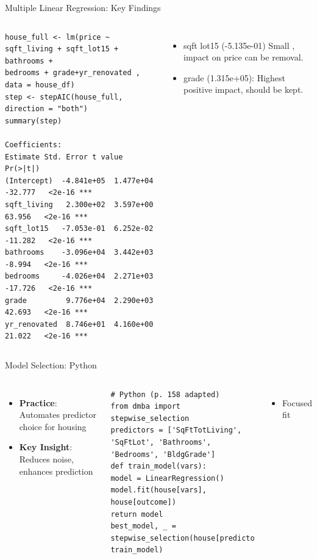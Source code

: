 \documentclass{beamer}
\begin{document}
	\begin{frame}[fragile]{Multiple Linear Regression: Key Findings}
	\begin{columns}
		\begin{lstlisting}
house_full <- lm(price ~ sqft_living + sqft_lot15 + bathrooms +
bedrooms + grade+yr_renovated , data = house_df)
step <- stepAIC(house_full, direction = "both")
summary(step)

Coefficients:
Estimate Std. Error t value Pr(>|t|)    
(Intercept)  -4.841e+05  1.477e+04 -32.777   <2e-16 ***
sqft_living   2.300e+02  3.597e+00  63.956   <2e-16 ***
sqft_lot15   -7.053e-01  6.252e-02 -11.282   <2e-16 ***
bathrooms    -3.096e+04  3.442e+03  -8.994   <2e-16 ***
bedrooms     -4.026e+04  2.271e+03 -17.726   <2e-16 ***
grade         9.776e+04  2.290e+03  42.693   <2e-16 ***
yr_renovated  8.746e+01  4.160e+00  21.022   <2e-16 ***

		\end{lstlisting}
		\begin{itemize}
      		\item sqft lot15 (-5.135e-01) Small , impact on price can be removal.
			\item grade (1.315e+05): Highest positive impact, should be kept.
	\end{itemize}
	\end{columns}
	\end{frame}
	
	
	\begin{frame}[fragile]{Model Selection: Python}
		\lstset{language=Python}
		\begin{columns}
			\column{0.6\textwidth}
			\begin{itemize}
				\item \textbf{Practice}: Automates predictor choice for housing
				\item \textbf{Key Insight}: Reduces noise, enhances prediction
			\end{itemize}
			\begin{lstlisting}
# Python (p. 158 adapted)
from dmba import stepwise_selection
predictors = ['SqFtTotLiving', 'SqFtLot', 'Bathrooms', 'Bedrooms', 'BldgGrade']
def train_model(vars):
model = LinearRegression()
model.fit(house[vars], house[outcome])
return model
best_model, _ = stepwise_selection(house[predictors].columns, train_model)
			\end{lstlisting}
			\column{0.4\textwidth}
			\begin{itemize}
				\item Focused fit
			\end{itemize}
		\end{columns}
	\end{frame}
	
\end{document}
